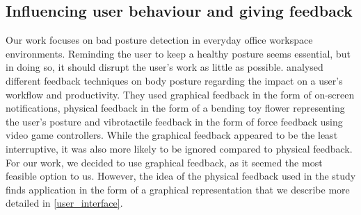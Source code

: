 
\subsection{Influencing user behaviour and giving feedback}
Our work focuses on bad posture detection in everyday office workspace environments. Reminding the user to keep a healthy posture seems essential, but in doing so, it should disrupt the user's work as little as possible. \citeauthor{haller2011finding} \cite{haller2011finding} analysed different feedback techniques on body posture regarding the impact on a user's workflow and productivity. They used graphical feedback in the form of on-screen notifications, physical feedback in the form of a bending toy flower representing the user's posture and vibrotactile feedback in the form of force feedback using video game controllers. While the graphical feedback appeared to be the least interruptive, it was also more likely to be ignored compared to physical feedback\cite{haller2011finding}. For our work, we decided to use graphical feedback, as it seemed the most feasible option to us. However, the idea of the physical feedback used in the study finds application in the form of a graphical representation that we describe more detailed in \autoref{user_interface}.

